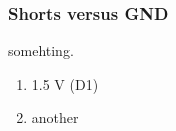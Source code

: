 \subsubsection{Shorts versus GND}

somehting.

\begin{enumerate}
    \item 1.5 V (D1)
    \item another
\end{enumerate}
